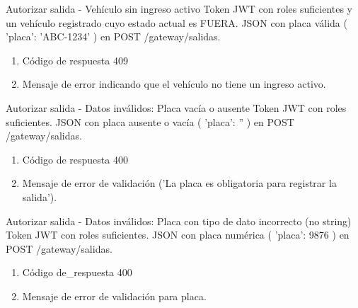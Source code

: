 {Autorizar salida - Vehículo sin ingreso activo}
{Token JWT con roles suficientes y un vehículo registrado cuyo estado actual es FUERA.}
{JSON con placa válida ({ 'placa': 'ABC-1234' }) en POST /gateway/salidas.}
{\begin{enumerate} [leftmargin=*, nosep]
    \item Código de respuesta 409
    \item Mensaje de error indicando que el vehículo no tiene un ingreso activo.
\end{enumerate}}

{Autorizar salida - Datos inválidos: Placa vacía o ausente}
{Token JWT con roles suficientes.}
{JSON con placa ausente o vacía ({ 'placa': '' }) en POST /gateway/salidas.}
{\begin{enumerate} [leftmargin=*, nosep]
    \item Código de respuesta 400
    \item Mensaje de error de validación ('La placa es obligatoria para registrar la salida').
\end{enumerate}}

{Autorizar salida - Datos inválidos: Placa con tipo de dato incorrecto (no string)}
{Token JWT con roles suficientes.}
{JSON con placa numérica ({ 'placa': 9876 }) en POST /gateway/salidas.}
{\begin{enumerate} [leftmargin=*, nosep]
    \item Código de\_respuesta 400
    \item Mensaje de error de validación para placa.
\end{enumerate}}

